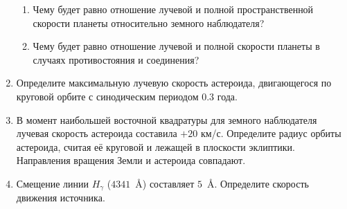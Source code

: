 \documentclass[12pt]{article}
\begin{document}
\begin{enumerate}
\begin{enumerate}
        \item Чему будет равно отношение лучевой и полной пространственной скорости планеты относительно земного наблюдателя?
        \item Чему будет равно отношение лучевой и полной скорости планеты в случаях противостояния и соединения?
    \end{enumerate}
    \item Определите максимальную лучевую скорость астероида, двигающегося по круговой орбите с синодическим периодом $0.3$ года.
    \item В момент наибольшей восточной квадратуры для земного наблюдателя лучевая скорость астероида составила $+20$ км/с. Определите радиус орбиты астероида, считая её круговой и лежащей в плоскости эклиптики. Направления вращения Земли и астероида совпадают.
    \item Смещение линии $H_{\gamma}$ ($4341$~\AA) составляет $5$~\AA. Определите скорость движения источника.
\end{enumerate}
\end{document}
